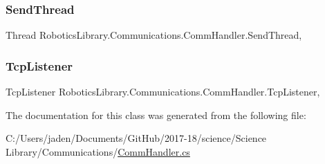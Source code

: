 \subsubsection{\texorpdfstring{Send\+Thread}{SendThread}}
{\footnotesize\ttfamily Thread Robotics\+Library.\+Communications.\+Comm\+Handler.\+Send\+Thread\hspace{0.3cm}{\ttfamily [static]}, {\ttfamily [private]}}

\mbox{\label{class_robotics_library_1_1_communications_1_1_comm_handler_a1f06912e8a026624986cda6fa0d7f7ac}} 
\subsubsection{\texorpdfstring{Tcp\+Listener}{TcpListener}}
{\footnotesize\ttfamily Tcp\+Listener Robotics\+Library.\+Communications.\+Comm\+Handler.\+Tcp\+Listener\hspace{0.3cm}{\ttfamily [static]}, {\ttfamily [private]}}



The documentation for this class was generated from the following file\+:\begin{DoxyCompactItemize}
\item 
C\+:/\+Users/jaden/\+Documents/\+Git\+Hub/2017-\/18/science/\+Science Library/\+Communications/\hyperlink{_comm_handler_8cs}{Comm\+Handler.\+cs}\end{DoxyCompactItemize}
